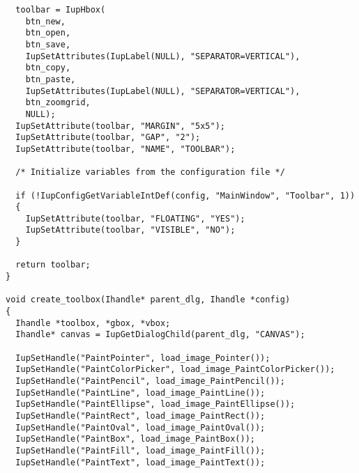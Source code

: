 \documentclass{ctexart}
\begin{document}
\begin{lstlisting}
  toolbar = IupHbox(
    btn_new,
    btn_open,
    btn_save,
    IupSetAttributes(IupLabel(NULL), "SEPARATOR=VERTICAL"),
    btn_copy,
    btn_paste,
    IupSetAttributes(IupLabel(NULL), "SEPARATOR=VERTICAL"),
    btn_zoomgrid,
    NULL);
  IupSetAttribute(toolbar, "MARGIN", "5x5");
  IupSetAttribute(toolbar, "GAP", "2");
  IupSetAttribute(toolbar, "NAME", "TOOLBAR");

  /* Initialize variables from the configuration file */

  if (!IupConfigGetVariableIntDef(config, "MainWindow", "Toolbar", 1))
  {
    IupSetAttribute(toolbar, "FLOATING", "YES");
    IupSetAttribute(toolbar, "VISIBLE", "NO");
  }

  return toolbar;
}

void create_toolbox(Ihandle* parent_dlg, Ihandle *config)
{
  Ihandle *toolbox, *gbox, *vbox;
  Ihandle* canvas = IupGetDialogChild(parent_dlg, "CANVAS");

  IupSetHandle("PaintPointer", load_image_Pointer());
  IupSetHandle("PaintColorPicker", load_image_PaintColorPicker());
  IupSetHandle("PaintPencil", load_image_PaintPencil());
  IupSetHandle("PaintLine", load_image_PaintLine());
  IupSetHandle("PaintEllipse", load_image_PaintEllipse());
  IupSetHandle("PaintRect", load_image_PaintRect());
  IupSetHandle("PaintOval", load_image_PaintOval());
  IupSetHandle("PaintBox", load_image_PaintBox());
  IupSetHandle("PaintFill", load_image_PaintFill());
  IupSetHandle("PaintText", load_image_PaintText());


\end{lstlisting}
\end{document}
